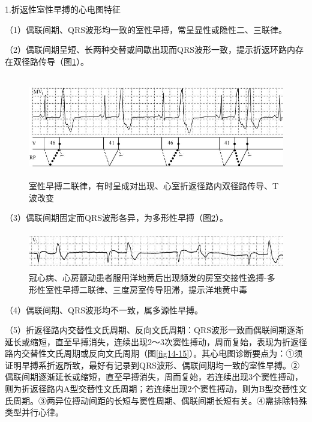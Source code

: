 1.折返性室性早搏的心电图特征

（1）偶联间期、QRS波形均一致的室性早搏，常呈显性或隐性二、三联律。

（2）偶联间期呈短、长两种交替或间歇出现而QRS波形一致，提示折返环路内存在双径路传导（图\ref{fig14-13}）。

\begin{figure}[!htbp]
 \centering
 \includegraphics[width=5.66667in,height=1.76042in]{./images/Image00259.jpg}
 \captionsetup{justification=centering}
 \caption{室性早搏二联律，有时呈成对出现、心室折返径路内双径路传导、T波改变}
 \label{fig14-13}
  \end{figure} 

（3）偶联间期固定而QRS波形各异，为多形性早搏（图\ref{fig14-14}）。

\begin{figure}[!htbp]
 \centering
 \includegraphics[width=5.57292in,height=0.64583in]{./images/Image00260.jpg}
 \captionsetup{justification=centering}
 \caption{冠心病、心房颤动患者服用洋地黄后出现频发的房室交接性逸搏-多形性室性早搏二联律、三度房室传导阻滞，提示洋地黄中毒}
 \label{fig14-14}
  \end{figure} 

（4）偶联间期、QRS波形均不一致，属多源性早搏。

（5）折返径路内交替性文氏周期、反向文氏周期：QRS波形一致而偶联间期逐渐延长或缩短，直至早搏消失，连续出现2～3次窦性搏动，周而复始，表现为折返径路内交替性文氏周期或反向文氏周期（图\ref{fig14-15}）。其心电图诊断要点为：①须证明早搏系折返所致，最好有记录到QRS波形、偶联间期均一致的室性早搏。②偶联间期逐渐延长或缩短，直至早搏消失，周而复始，若连续出现3个窦性搏动，则为折返径路内A型交替性文氏周期；若连续出现2个窦性搏动，则为B型交替性文氏周期。③两异位搏动间距的长短与窦性周期、偶联间期长短有关。④需排除特殊类型并行心律。

